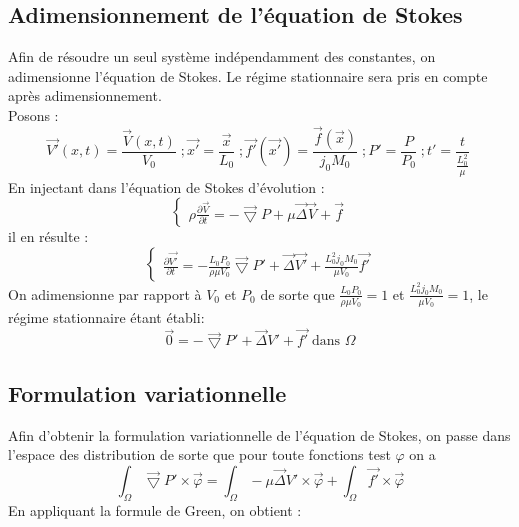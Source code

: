 \documentclass[a4paper,12pt,titlepage]{report}
\begin{document}
\begin{onehalfspace}

\subsection{Adimensionnement de l'équation de Stokes}

\normalsize Afin de résoudre un seul système indépendamment des constantes, on adimensionne l'équation de Stokes. Le régime stationnaire sera pris en compte après adimensionnement.
\\%
Posons :
\begin{equation*}
\vec{V'}(x,t)=\frac{\vec{V}(x,t)}{V_0}\;;\vec{x'}=\frac{\vec{x}}{L_0}\; ; \vec{f'}(\vec{x'})=\frac{\vec{f}(\vec{x})}{j_0M_0}\;;P'=\frac{P}{P_0}\; ;t'=\frac{t}{\frac{L_0^2}{\mu}}\;
\end{equation*}
En injectant dans l'équation de Stokes d'évolution :
\begin{equation*}
  \left\{
    \begin{aligned}
    \rho\frac{\partial \vec{V}}{\partial t}=-\vec{\bigtriangledown} P + \mu \vec{\Delta}\vec{V}+\vec{f}
        \end{aligned}
  \right.
\end{equation*}
il en résulte :
\begin{equation*}
  \left\{
    \begin{aligned}
    \frac{\partial \vec{V'}}{\partial t}=-\frac{L_0 P_0}{\rho \mu V_0}\vec{\bigtriangledown} P '+  \vec{\Delta}\vec{V'}+\frac{L_0^2j_0M_0}{\mu V_0}\vec{f'}
        \end{aligned}
  \right.
\end{equation*}
On adimensionne par rapport à $V_0$ et $P_0$ de sorte que $\frac{L_0 P_0}{\rho \mu V_0}=1$ et $ \frac{L_0^2j _0M_0}{\mu V_0}=1$, le régime stationnaire étant établi:
\[
      \vec{0}=-\vec{\bigtriangledown}P' +\vec{\Delta}V' +\vec{f'}\;\text{dans }\Omega 
\]

\subsection{Formulation variationnelle}

Afin d'obtenir la formulation variationnelle de l'équation de Stokes, on passe dans l'espace des distribution de sorte que pour toute fonctions test $\varphi$ on a 
\[
	\int_\Omega\vec{\bigtriangledown}P'\times \vec \varphi=\int_\Omega-\mu\vec{\Delta}V'\times \vec \varphi +\int_\Omega\vec{f'}\times \vec \varphi 
\]
En appliquant la formule de Green, on obtient :


\end{onehalfspace}
\end{document}
